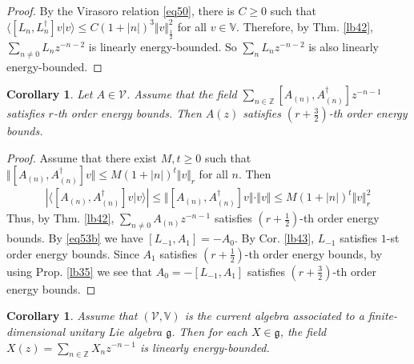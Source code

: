 \documentclass[12pt,b5paper,notitlepage]{article}
\theoremstyle{definition}
\theoremstyle{plain}
\newtheorem{co}[df]{Corollary}
\newcommand{\mc}{\mathcal}
\newcommand{\bk}[1]{\langle {#1}\rangle}
\newcommand{\gk}{\mathfrak g}
\newcommand{\Vbb}{\mathbb V}
\newcommand{\Zbb}{\mathbb Z}
\numberwithin{equation}{section}
\begin{document}
\begin{proof}
By the Virasoro relation \eqref{eq50}, there is $C\geq0$ such that $\bk{[L_n,L_n^\dagger]v|v}\leq C(1+|n|)^3\Vert v\Vert_{\frac 12}^2$ for all $v\in\Vbb$. Therefore, by Thm. \ref{lb42}, $\sum_{n\neq 0}L_nz^{-n-2}$ is linearly energy-bounded. So $\sum_n L_nz^{-n-2}$ is also linearly energy-bounded.
\end{proof}


\begin{co}
Let $A\in\mc V$. Assume that the field $\sum_{n\in\Zbb}[A_{(n)},A_{(n)}^\dagger]z^{-n-1}$ satisfies $r$-th order energy bounds. Then $A(z)$ satisfies $(r+\frac 32)$-th order energy bounds.
\end{co}

\begin{proof}
Assume that there exist $M,t\geq0$ such that $\Vert[A_{(n)},A_{(n)}^\dagger]v\Vert\leq M(1+|n|)^t\Vert v\Vert_r$ for all $n$. Then
\begin{align*}
|\bk{[A_{(n)},A_{(n)}^\dagger]v|v}|\leq \Vert[A_{(n)},A_{(n)}^\dagger]v\Vert\cdot \Vert v\Vert\leq M(1+|n|)^t\Vert v\Vert_r^2
\end{align*}
Thus, by Thm. \ref{lb42}, $\sum_{n\neq 0}A_{(n)}z^{-n-1}$ satisfies $(r+\frac 12)$-th order energy bounds. By \eqref{eq53b} we have $[L_{-1},A_1]=-A_0$. By Cor. \ref{lb43}, $L_{-1}$ satisfies $1$-st order energy bounds. Since $A_1$ satisfies $(r+\frac 12)$-th order energy bounds, by using Prop. \ref{lb35} we see that $A_0=-[L_{-1},A_1]$ satisfies $(r+\frac 32)$-th order energy bounds.
\end{proof}


\begin{co}
Assume that $(\mc V,\Vbb)$ is the current algebra associated to a finite-dimensional unitary Lie algebra $\gk$. Then for each $X\in\gk$, the field $X(z)=\sum_{n\in\Zbb}X_nz^{-n-1}$ is linearly energy-bounded.
\end{co}
\end{document}
